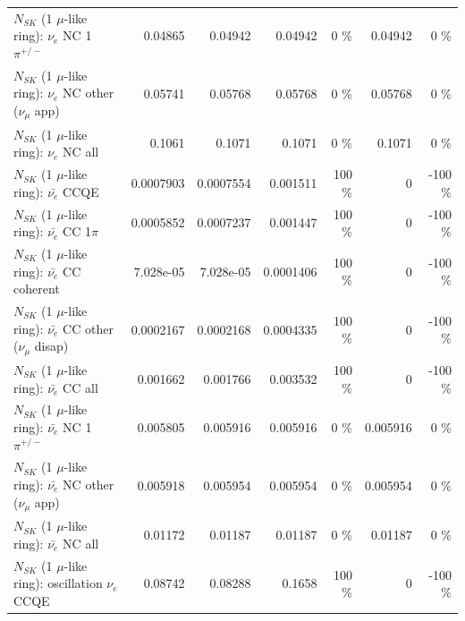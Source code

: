 \begin{table}
\begin{tabular}{| l | r | r | r  r | r  r |}
\hline
                           $N_{SK}$ (1 $\mu$-like ring): $\nu_e$ NC 1$\pi^{+/-}$ &         0.04865 &         0.04942 &         0.04942 &        0 \%  &         0.04942 &        0 \%  \\ 
                  $N_{SK}$ (1 $\mu$-like ring): $\nu_e$ NC other ($\nu_\mu$ app) &         0.05741 &         0.05768 &         0.05768 &        0 \%  &         0.05768 &        0 \%  \\ 
                                  $N_{SK}$ (1 $\mu$-like ring): $\nu_{e}$ NC all &          0.1061 &          0.1071 &          0.1071 &        0 \%  &          0.1071 &        0 \%  \\ 
\hline
\hline
\hline
                                $N_{SK}$ (1 $\mu$-like ring): $\bar{\nu_e}$ CCQE &       0.0007903 &       0.0007554 &        0.001511 &      100 \%  &               0 &     -100 \%  \\ 
                           $N_{SK}$ (1 $\mu$-like ring): $\bar{\nu_e}$ CC 1$\pi$ &       0.0005852 &       0.0007237 &        0.001447 &      100 \%  &               0 &     -100 \%  \\ 
                         $N_{SK}$ (1 $\mu$-like ring): $\bar{\nu_e}$ CC coherent &       7.028e-05 &       7.028e-05 &       0.0001406 &      100 \%  &               0 &     -100 \%  \\ 
          $N_{SK}$ (1 $\mu$-like ring): $\bar{\nu_e}$ CC other ($\nu_\mu$ disap) &       0.0002167 &       0.0002168 &       0.0004335 &      100 \%  &               0 &     -100 \%  \\ 
                            $N_{SK}$ (1 $\mu$-like ring): $\bar{\nu_{e}}$ CC all &        0.001662 &        0.001766 &        0.003532 &      100 \%  &               0 &     -100 \%  \\ 
\hline
                     $N_{SK}$ (1 $\mu$-like ring): $\bar{\nu_e}$ NC 1$\pi^{+/-}$ &        0.005805 &        0.005916 &        0.005916 &        0 \%  &        0.005916 &        0 \%  \\ 
            $N_{SK}$ (1 $\mu$-like ring): $\bar{\nu_e}$ NC other ($\nu_\mu$ app) &        0.005918 &        0.005954 &        0.005954 &        0 \%  &        0.005954 &        0 \%  \\ 
                            $N_{SK}$ (1 $\mu$-like ring): $\bar{\nu_{e}}$ NC all &         0.01172 &         0.01187 &         0.01187 &        0 \%  &         0.01187 &        0 \%  \\ 
\hline
\hline
\hline
                          $N_{SK}$ (1 $\mu$-like ring): oscillation $\nu_e$ CCQE &         0.08742 &         0.08288 &          0.1658 &      100 \%  &               0 &     -100 \%  \\ 

\end{tabular}
\end{table}
